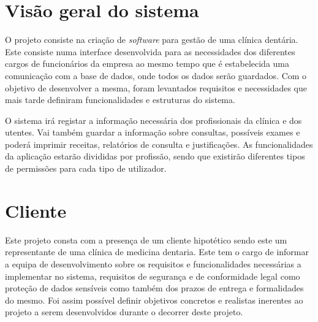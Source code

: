 \documentclass[11pt,a4paper,twoside]{report}
\begin{document}
%
%	
\section{Visão geral do sistema }

O projeto consiste na criação de \textit{software} para gestão de uma clínica dentária.
Este consiste numa interface desenvolvida para as necessidades dos diferentes cargos de funcionários da empresa ao mesmo tempo que é estabelecida uma comunicação com a base de dados, onde todos os dados serão guardados.
Com o objetivo de desenvolver a mesma, foram levantados requisitos e necessidades que mais tarde definiram funcionalidades e estruturas do sistema.

O sistema irá registar a informação necessária dos profissionais da clínica e dos utentes.
Vai também guardar a informação sobre consultas, possíveis exames e poderá imprimir receitas, relatórios de consulta e justificações.
As funcionalidades da aplicação estarão divididas por profissão, sendo que existirão diferentes tipos de permissões para cada tipo de utilizador.


\section{Cliente}

Este projeto consta com a presença de um cliente hipotético sendo este um representante de uma clínica de medicina dentaria.
Este tem o cargo de informar a equipa de desenvolvimento sobre os requisitos e funcionalidades necessárias a implementar no sistema, requisitos de segurança e de conformidade legal como proteção de dados sensíveis como também dos prazos de entrega e formalidades do mesmo.
Foi assim possível definir objetivos concretos e realistas inerentes ao projeto a serem desenvolvidos durante o decorrer deste projeto.
\end{document}
